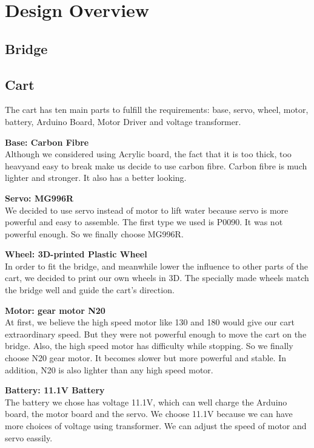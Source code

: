 \section{Design Overview}
\subsection{Bridge}
\subsection{Cart}

The cart has ten main parts to fulfill the requirements: base, servo, wheel,
motor, battery, Arduino Board, Motor Driver and voltage transformer.

\bigskip
\textbf{Base: Carbon Fibre} \\
\indent
Although we considered using Acrylic board, the fact that it is too thick, too
heavyand easy to break make us decide to use carbon fibre.
Carbon fibre is much lighter and stronger.
It also has a better looking. 

\bigskip
\textbf{Servo: MG996R}  \\
\indent
We decided to use servo instead of motor to lift water because servo is more
powerful and easy to assemble. 
The first type we used is P0090.
It was not powerful enough.
So we finally choose MG996R. 

\bigskip
\textbf{Wheel: 3D-printed Plastic Wheel } \\
\indent
In order to fit the bridge, and meanwhile lower the influence to other parts of
the cart, we decided to print our own wheels in 3D.
The specially made wheels match the bridge well and guide the cart’s direction.

\bigskip
\textbf{Motor:  gear motor N20 } \\
\indent
At first, we believe the high speed motor like 130 and 180 would give our cart
extraordinary speed.
But they were not powerful enough to move the cart on the bridge.
Also, the high speed motor has difficulty while stopping.
So we finally choose N20 gear motor.
It becomes slower but more powerful and stable.
In addition, N20 is also lighter than any high speed motor.  

\bigskip
\textbf{Battery: 11.1V Battery } \\
\indent
The battery we chose has voltage 11.1V, which can well charge the Arduino board,
the motor board and the servo.
We choose 11.1V because we can have more choices of voltage using transformer.
We can adjust the speed of motor and servo eassily.  

